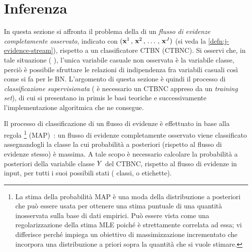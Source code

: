\section{Inferenza}\label{sec:inference-ctbnc}
In questa sezione si affronta il problema della \emph{} di un \emph{flusso di evidenze completamente osservato}, indicato con $(\mathbf{x}^1\,,\,\mathbf{x}^2\,,\,\dotsc\,,\,\mathbf{x}^{J})$ (si veda la \autoref{defn:j-evidence-stream}), rispetto a un classificatore \acs{CTBN} (\acs{CTBNC}). Si osservi che, in tale situazione (\ie{} \emph{}), l'unica variabile casuale non osservata è la variabile classe, perciò è possibile sfruttare le relazioni di indipendenza fra variabili casuali così come si fa per le \acl{BN}. L'argomento di questa sezione è quindi il processo di \emph{classificazione supervisionata} (\ie{} è necessario un \acs{CTBNC} appreso da un \emph{training set}), di cui si presentano in primis le basi teoriche e successivamente l'implementazione algoritmica che ne consegue.

Il processo di classificazione di un flusso di evidenze è effettuato in base alla regola \emph{}\footnote{La stima della probabilità \acf{MAP} è una moda della distribuzione a posteriori che può essere usata per ottenere una stima puntuale di una quantità inosservata sulla base di dati empirici. Può essere vista come una regolarizzazione della stima \acf{MLE} poiché è strettamente correlata ad essa; vi differisce perché impiega un obiettivo di massimizzazione incrementato che incorpora una distribuzione a priori sopra la quantità che si vuole stimare.} (\acs{MAP})~\citep[si veda][]{Stella2012}: un flusso di evidenze completamente osservato viene classificato assegnandogli la classe la cui probabilità a posteriori (rispetto al flusso di evidenze stesso) è massima. A tale scopo è necessario calcolare la probabilità a posteriori della variabile classe $\mathnormal{Y}$ del \acs{CTBNC}, rispetto al flusso di evidenze in input, per tutti i suoi possibili stati (\ie{} classi, o etichette).

